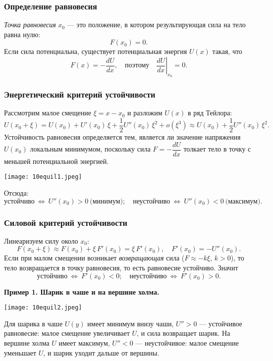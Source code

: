 \documentclass[12pt, a4paper]{article}%
\begin{document}
\subsubsection*{Определение равновесия}
\textit{Точка равновесия} $x_0$ — это положение, в котором результирующая сила на тело равна нулю:
\[
F(x_0)=0.
\]
Если сила потенциальна, существует потенциальная энергия $U(x)$ такая, что
\[
F(x)=-\frac{dU}{dx},\quad \text{поэтому}\quad \left.\frac{dU}{dx}\right|_{x_0}=0.
\]

\subsubsection*{Энергетический критерий устойчивости}
Рассмотрим малое смещение $\xi=x-x_0$ и разложим $U(x)$ в ряд Тейлора:
\[
U(x_0+\xi)=U(x_0)+U'(x_0)\,\xi+\frac12 U''(x_0)\,\xi^2+o(\xi^3) \approx U(x_0)+\frac12 U''(x_0)\,\xi^2.
\]
Устойчивость равновесия определяется тем, является ли значение напряжения
$U(x_0)$ локальным минимумом, поскольку сила $F = -\dfrac{dU}{dx}$ толкает тело в точку с меньшей потенциальной энергией. 



\begin{center}
\texttt{[image: 10equil1.jpeg]}
\label{fig:mpr}
\end{center}

Отсюда:
\[
\text{устойчиво}\ \Leftrightarrow\ U''(x_0)>0\ \text{(минимум)};\quad
\text{неустойчиво}\ \Leftrightarrow\ U''(x_0)<0\ \text{(максимум)}.
\]

\subsubsection*{Силовой критерий устойчивости}
Линеаризуем силу около $x_0$:
\[
F(x_0+\xi)\approx F(x_0)+\xi\,F'(x_0)=\xi\,F'(x_0),\quad F'(x_0)=-U''(x_0).
\]
Если при малом смещении возникает \emph{возвращающая} сила ($F\approx -k\xi$, $k>0$), то тело возвращается в точку равновесия, то есть равновесие устойчиво. Значит
\[
\text{устойчиво}\ \Leftrightarrow\ F'(x_0)<0;\quad
\text{неустойчиво}\ \Leftrightarrow\ F'(x_0)>0.
\]


\textbf{Пример 1. Шарик в чаше и на вершине холма.}

\begin{center}
\texttt{[image: 10equil2.jpeg]}
\label{fig:mpr}
\end{center}

Для шарика в чаше $U(y)$ имеет минимум внизу чаши, $U''>0$ — устойчивое равновесие: малое смещение увеличивает $U$, и сила возвращает шарик. На вершине холма $U$ имеет максимум, $U''<0$ — неустойчивое: малое смещение уменьшает $U$, и шарик уходит дальше от вершины.
\end{document}
